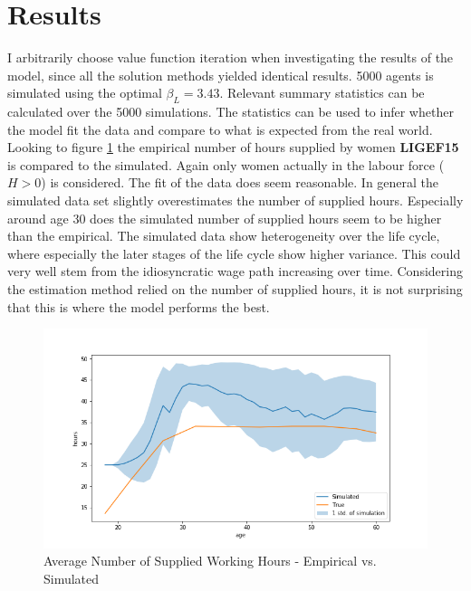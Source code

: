 \section{Results}

I arbitrarily choose value function iteration when investigating the results of the model, since all the solution methods yielded identical results. 5000 agents is simulated using the optimal $\beta_L = 3.43$. Relevant summary statistics can be calculated over the 5000 simulations. The statistics can be used to infer whether the model fit the data and compare to what is expected from the real world. Looking to figure \ref{fig:dqi_model1_average_path_sim_vs_empirical} the empirical number of hours supplied by women \textbf{LIGEF15} is compared to the simulated. Again only women actually in the labour force  ($H>0$) is considered. The fit of the data does seem reasonable. In general the simulated data set slightly overestimates the number of supplied hours. Especially around age 30 does the simulated number of supplied hours seem to be higher than the empirical. The simulated data show heterogeneity over the life cycle, where especially the later stages of the life cycle show higher variance. This could very well stem from the idiosyncratic wage path increasing over time. Considering the estimation method relied on the number of supplied hours, it is not surprising that this is where the model performs the best. 


\begin{figure}
    \centering
    \includegraphics[scale=0.4]{figures/dqi_model1_estimation_labour_supply.png}
    \caption{Average Number of Supplied Working Hours - Empirical vs. Simulated}
    \label{fig:dqi_model1_average_path_sim_vs_empirical}
\end{figure}

